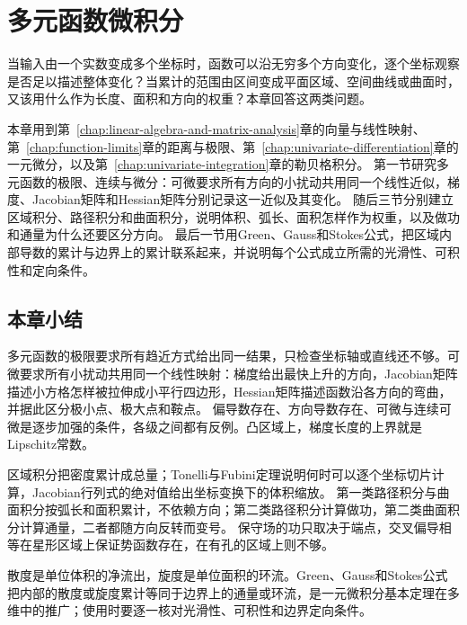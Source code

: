 \chapter{多元函数微积分}
\label{chap:multivariate-calculus}
\label{chap:multivariable-functions}

当输入由一个实数变成多个坐标时，函数可以沿无穷多个方向变化，逐个坐标观察是否足以描述整体变化？当累计的范围由区间变成平面区域、空间曲线或曲面时，又该用什么作为长度、面积和方向的权重？本章回答这两类问题。

本章用到第~\ref{chap:linear-algebra-and-matrix-analysis}章的向量与线性映射、第~\ref{chap:function-limits}章的距离与极限、第~\ref{chap:univariate-differentiation}章的一元微分，以及第~\ref{chap:univariate-integration}章的勒贝格积分。
第一节研究多元函数的极限、连续与微分：可微要求所有方向的小扰动共用同一个线性近似，梯度、Jacobian矩阵和Hessian矩阵分别记录这一近似及其变化。
随后三节分别建立区域积分、路径积分和曲面积分，说明体积、弧长、面积怎样作为权重，以及做功和通量为什么还要区分方向。
最后一节用Green、Gauss和Stokes公式，把区域内部导数的累计与边界上的累计联系起来，并说明每个公式成立所需的光滑性、可积性和定向条件。







\FloatBarrier
\section{本章小结}
\label{sec:multivariable-summary}

多元函数的极限要求所有趋近方式给出同一结果，只检查坐标轴或直线还不够。可微要求所有小扰动共用同一个线性映射：梯度给出最快上升的方向，Jacobian矩阵描述小方格怎样被拉伸成小平行四边形，Hessian矩阵描述函数沿各方向的弯曲，并据此区分极小点、极大点和鞍点。
偏导数存在、方向导数存在、可微与连续可微是逐步加强的条件，各级之间都有反例。凸区域上，梯度长度的上界就是Lipschitz常数。

区域积分把密度累计成总量；Tonelli与Fubini定理说明何时可以逐个坐标切片计算，Jacobian行列式的绝对值给出坐标变换下的体积缩放。
第一类路径积分与曲面积分按弧长和面积累计，不依赖方向；第二类路径积分计算做功，第二类曲面积分计算通量，二者都随方向反转而变号。
保守场的功只取决于端点，交叉偏导相等在星形区域上保证势函数存在，在有孔的区域上则不够。

散度是单位体积的净流出，旋度是单位面积的环流。Green、Gauss和Stokes公式把内部的散度或旋度累计等同于边界上的通量或环流，是一元微积分基本定理在多维中的推广；使用时要逐一核对光滑性、可积性和边界定向条件。
